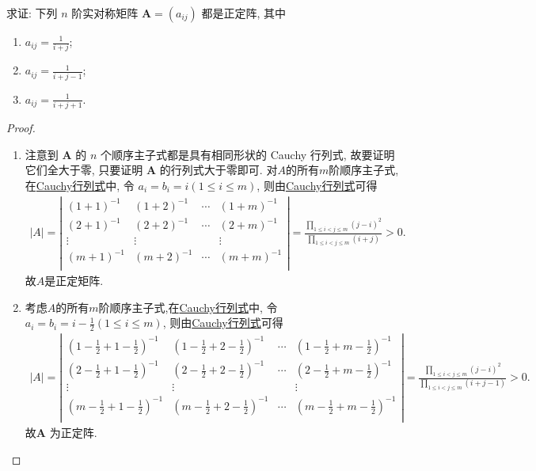 \documentclass[../../main.tex]{subfiles}%
\begin{document}
\begin{example}\label{example:例8.48}
求证: 下列 \(n\) 阶实对称矩阵 \(\boldsymbol{A}=(a_{ij})\) 都是正定阵, 其中
\begin{enumerate}[(1)]
\item \(a_{ij}=\frac{1}{i + j}\);
\item \(a_{ij}=\frac{1}{i + j - 1}\);
\item \(a_{ij}=\frac{1}{i + j + 1}\).
\end{enumerate}
\end{example}
\begin{proof}
\begin{enumerate}[(1)]
\item 注意到 \(\boldsymbol{A}\) 的 \(n\) 个顺序主子式都是具有相同形状的 Cauchy 行列式, 故要证明它们全大于零, 只要证明 \(\boldsymbol{A}\) 的行列式大于零即可. 对$A$的所有$m$阶顺序主子式,在\hyperref[Cauchy行列式]{Cauchy行列式}中, 令 \(a_i = b_i = i(1\leqslant  i\leqslant  m)\), 则由\hyperref[Cauchy行列式]{Cauchy行列式}可得
\begin{align*}
|A|=\left| \begin{matrix}
(1+1)^{-1}&		(1+2)^{-1}&		\cdots&		(1+m)^{-1}\\
(2+1)^{-1}&		(2+2)^{-1}&		\cdots&		(2+m)^{-1}\\
\vdots&		\vdots&		&		\vdots\\
(m+1)^{-1}&		(m+2)^{-1}&		\cdots&		(m+m)^{-1}\\
\end{matrix} \right|=\frac{\prod\limits_{1\leqslant i<j\leqslant m}{\left( j-i \right) ^2}}{\prod\limits_{1\leqslant i<j\leqslant m}{\left( i+j \right)}}>0.
\end{align*}
故$A$是正定矩阵.

\item 考虑$A$的所有$m$阶顺序主子式,在\hyperref[Cauchy行列式]{Cauchy行列式}中, 令 \(a_i = b_i = i-\frac{1}{2}(1\leqslant  i\leqslant  m)\), 则由\hyperref[Cauchy行列式]{Cauchy行列式}可得
\begin{align*}
|A|=\left| \begin{matrix}
(1-\frac{1}{2}+1-\frac{1}{2})^{-1}&		(1-\frac{1}{2}+2-\frac{1}{2})^{-1}&		\cdots&		(1-\frac{1}{2}+m-\frac{1}{2})^{-1}\\
(2-\frac{1}{2}+1-\frac{1}{2})^{-1}&		(2-\frac{1}{2}+2-\frac{1}{2})^{-1}&		\cdots&		(2-\frac{1}{2}+m-\frac{1}{2})^{-1}\\
\vdots&		\vdots&		&		\vdots\\
(m-\frac{1}{2}+1-\frac{1}{2})^{-1}&		(m-\frac{1}{2}+2-\frac{1}{2})^{-1}&		\cdots&		(m-\frac{1}{2}+m-\frac{1}{2})^{-1}\\
\end{matrix} \right|=\frac{\prod\limits_{1\leqslant i<j\leqslant m}{\left( j-i \right) ^2}}{\prod\limits_{1\leqslant i<j\leqslant m}{\left( i+j-1 \right)}}>0.
\end{align*}
故\(\boldsymbol{A}\) 为正定阵.


\end{enumerate}
\end{proof}
\end{document}
